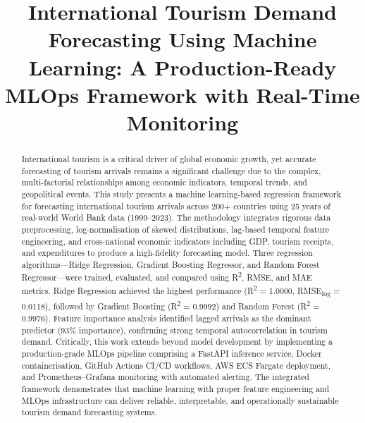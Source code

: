 \documentclass[conference]{IEEEtran}
\begin{document}
\title{International Tourism Demand Forecasting Using Machine
Learning: A Production-Ready MLOps Framework with
Real-Time Monitoring}

\author{
}

\maketitle

\begin{abstract}
International tourism is a critical driver of global economic
growth, yet accurate forecasting of tourism arrivals remains a
significant challenge due to the complex, multi-factorial
relationships among economic indicators, temporal trends, and
geopolitical events. This study presents a machine
learning-based regression framework for forecasting
international tourism arrivals across 200+ countries using
25 years of real-world World Bank data (1999--2023).
The methodology integrates rigorous data preprocessing,
log-normalisation of skewed distributions, lag-based temporal
feature engineering, and cross-national economic indicators
including GDP, tourism receipts, and expenditures to produce
a high-fidelity forecasting model. Three regression
algorithms---Ridge Regression, Gradient Boosting Regressor,
and Random Forest Regressor---were trained, evaluated, and
compared using R\textsuperscript{2}, RMSE, and MAE metrics.
Ridge Regression achieved the highest performance
(R\textsuperscript{2} = 1.0000, RMSE\textsubscript{log} =
0.0118), followed by Gradient Boosting
(R\textsuperscript{2} = 0.9992) and Random Forest
(R\textsuperscript{2} = 0.9976). Feature importance analysis
identified lagged arrivals as the dominant predictor (93\%
importance), confirming strong temporal autocorrelation in
tourism demand. Critically, this work extends beyond model
development by implementing a production-grade MLOps
pipeline comprising a FastAPI inference service, Docker
containerisation, GitHub Actions CI/CD workflows, AWS ECS
Fargate deployment, and Prometheus--Grafana monitoring with
automated alerting. The integrated framework demonstrates
that machine learning with proper feature engineering and
MLOps infrastructure can deliver reliable, interpretable, and
operationally sustainable tourism demand forecasting systems.
\end{abstract}
\end{document}
